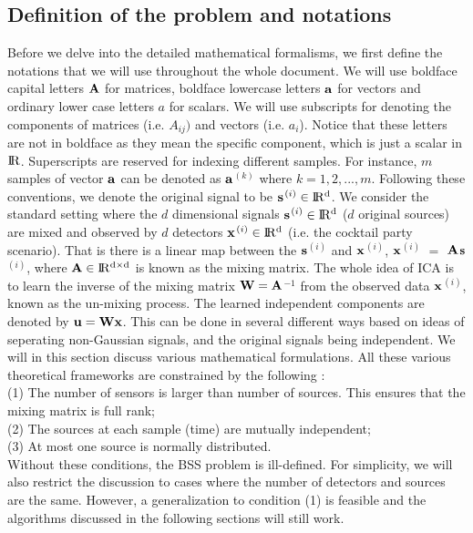 \documentclass[aps,prl,preprint,superscriptaddress]{revtex4-2}
\begin{document}
\subsection{Definition of the problem and notations}
Before we delve into the detailed mathematical formalisms, we first define the notations that we will use throughout the whole document. We will use boldface capital letters $\bf{A}$ for matrices, boldface lowercase letters $\bf{a}$ for vectors and ordinary lower case letters $a$ for scalars. We will use subscripts for denoting the components of matrices (i.e. $A_{ij})$ and vectors (i.e. $a_{i}$). Notice that these letters are not in boldface as they mean the specific component, which is just a scalar in $ \rm I\!R$. Superscripts are reserved for indexing different samples. For instance, $m$ samples of vector $\bf{a}$ can be denoted as $\bf{a}$$^{(k)}$ where $k = 1, 2, ..., m$. Following these conventions, we denote the original signal to be $\bf{s}$$^{(i)} \in \rm I\!R^{d}$. We consider the standard setting where the $d$ dimensional signals $\bf{s}$$^{(i)} \in \rm I\!R^{d}$ ($d$ original sources) are mixed and observed by $d$ detectors $\bf{x}$$^{(i)} \in \rm I\!R^{d}$ (i.e. the cocktail party scenario). That is there is a linear map between the $\bf{s}$$^{(i)}$ and $\bf{x}$$^{(i)}$, $\bf{x}$$^{(i)}$ $=$ $\bf{A}$$\bf{s}$$^{(i)}$, where $\bf{A} \in \rm I\!R^{d\times d}$ is known as the mixing matrix. The whole idea of ICA is to learn the inverse of the mixing matrix $\bf{W} = \bf{A}$$^{-1}$ from the observed data $\bf{x}$$^{(i)}$, known as the un-mixing process. The learned independent components are denoted by $\bf{u} = \bf{W}\bf{x}$. This can be done in several different ways based on ideas of seperating non-Gaussian signals, and the original signals being independent. We will in this section discuss various mathematical formulations. All these various theoretical frameworks are constrained by the following \cite{lee1998independent}:\\
(1) The number of sensors is larger than number of sources. This ensures that the mixing matrix is full rank; \\
(2) The sources at each sample (time) are mutually independent; \\
(3) At most one source is normally distributed. \\
Without these conditions, the BSS problem is ill-defined. For simplicity, we will also restrict the discussion to cases where the number of detectors and sources are the same. However, a generalization to condition (1) is feasible and the algorithms discussed in the following sections will still work.
\end{document}
